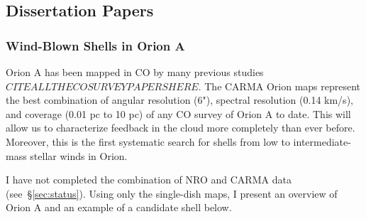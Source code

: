     \subsection{Dissertation Papers}\label{sec:papers}
        \subsubsection{Wind-Blown Shells in Orion A}\label{sec:paper1}
Orion A has been mapped in CO by many previous studies$CITE ALL THE CO SURVEY PAPERS HERE$. The CARMA Orion maps represent the best combination of angular resolution (6"), spectral resolution (0.14 km/s), and coverage (0.01 pc to 10 pc) of any CO survey of Orion A to date. This will allow us to characterize feedback in the cloud more completely than ever before. Moreover, this is the first systematic search for shells from low to intermediate-mass stellar winds in Orion.
        
I have not completed the combination of NRO and CARMA data (see~\S\ref{sec:status}).  Using only the single-dish maps, I present an overview of Orion A and an example of a candidate shell below.
    
  
